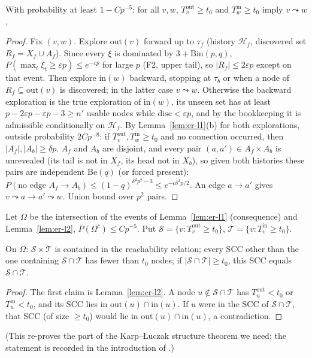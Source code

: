 \begin{lemma}\label{lem:er-l2}
With probability at least $1-Cp^{-5}$: for all $v,w$, $T^{\mathrm{out}}_v\ge t_0$
and $T^{\mathrm{in}}_w\ge t_0$ imply $v\leadsto w$.
\end{lemma}
\begin{proof}
Fix $(v,w)$. Explore $\mathrm{out}(v)$ forward up to $\tau_f$ (history $\mathcal H_f$,
discovered set $R_f=X_f\cup A_f$). Since every $\xi$ is dominated by
$3+\mathrm{Bin}(p,q)$, $P(\max_t\xi_t\ge\varepsilon p)\le e^{-\varepsilon p}$ for
large $p$ (F2, upper tail), so $|R_f|\le2\varepsilon p$ except on that event.
Then explore $\mathrm{in}(w)$ backward, stopping at $\tau_b$ or when a node of
$R_f\subseteq\mathrm{out}(v)$ is discovered; in the latter case $v\leadsto w$.
Otherwise the backward exploration is the true exploration of $\mathrm{in}(w)$,
its unseen set has at least $p-2\varepsilon p-\varepsilon p-3\ge n'$ usable
nodes while $\mathrm{disc}<\varepsilon p$, and by the bookkeeping it is admissible
conditionally on $\mathcal H_f$. By Lemma~\ref{lem:er-l1}(b) for both
explorations, outside probability $2Cp^{-8}$: if $T^{\mathrm{out}}_v,T^{\mathrm{in}}_w\ge t_0$
and no connection occurred, then $|A_f|,|A_b|\ge\delta p$. $A_f$ and $A_b$ are
disjoint, and every pair $(a,a')\in A_f\times A_b$ is unrevealed (its tail is not
in $X_f$, its head not in $X_b$), so given both histories these pairs are
independent Be$(q)$ (or forced present): $P(\text{no edge }A_f\to A_b)\le(1-q)^{\delta^2p^2-3}\le e^{-c\delta^2p/2}$.
An edge $a\to a'$ gives $v\leadsto a\to a'\leadsto w$. Union bound over $p^2$
pairs.
\end{proof}

Let $\Omega$ be the intersection of the events of Lemma~\ref{lem:er-l1}
(consequence) and Lemma~\ref{lem:er-l2}, $P(\Omega^c)\le Cp^{-5}$. Put
$\mathcal S=\{v:T^{\mathrm{out}}_v\ge t_0\}$, $\mathcal T=\{v:T^{\mathrm{in}}_v\ge t_0\}$.

\begin{corollary}[structure]\label{cor:er-struct}
On $\Omega$: $\mathcal S\times\mathcal T$ is contained in the reachability
relation; every SCC other than the one containing $\mathcal S\cap\mathcal T$ has
fewer than $t_0$ nodes; if $|\mathcal S\cap\mathcal T|\ge t_0$, this SCC equals
$\mathcal S\cap\mathcal T$.
\end{corollary}
\begin{proof}
The first claim is Lemma~\ref{lem:er-l2}. A node $u\notin\mathcal S\cap\mathcal T$
has $T^{\mathrm{out}}_u<t_0$ or $T^{\mathrm{in}}_u<t_0$, and its SCC lies in
$\mathrm{out}(u)\cap\mathrm{in}(u)$. If $u$ were in the SCC of
$\mathcal S\cap\mathcal T$, that SCC (of size $\ge t_0$) would lie in
$\mathrm{out}(u)\cap\mathrm{in}(u)$, a contradiction.
\end{proof}
(This re-proves the part of the Karp--{\L}uczak structure theorem we need; the
statement is recorded in the introduction of \citealp{dovgal2020birth}.)

